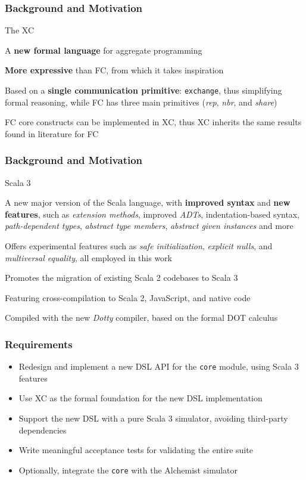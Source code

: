 \begin{frame}
    \frametitle{Background and Motivation}
    \begin{blockitems}{The \ac{XC}}
        \item A \textbf{new formal language} for aggregate programming~\cite{xc}
        \item \textbf{More expressive} than \ac{FC}, from which it takes inspiration
        \item Based on a \textbf{single communication primitive}: \texttt{exchange}, thus simplifying formal reasoning, while \ac{FC} has three main primitives (\textit{rep}, \textit{nbr}, and \textit{share})
        \item \ac{FC} core constructs can be implemented in \ac{XC}, thus \ac{XC} inherits the same results found in literature for \ac{FC}
    \end{blockitems}
\end{frame}

\begin{frame}
    \frametitle{Background and Motivation}
    \begin{blockitems}{Scala 3}
        \item A new major version of the Scala language, with \textbf{improved syntax} and \textbf{new features}, such as \textit{extension methods}, improved \textit{\acp{ADT}}, indentation-based syntax, \textit{path-dependent types}, \textit{abstract type members}, \textit{abstract given instances} and more
        \item Offers experimental features such as \textit{safe initialization}, \textit{explicit nulls}, and \textit{multiversal equality}, all employed in this work
        \item Promotes the migration of existing Scala 2 codebases to Scala 3
        \item Featuring cross-compilation to Scala 2, JavaScript, and native code
        \item Compiled with the new \textit{Dotty} compiler, based on the formal \ac{DOT} calculus
    \end{blockitems}
\end{frame}

\begin{frame}
    \frametitle{Requirements}
    \begin{itemize}
        \item Redesign and implement a new \ac{DSL} \ac{API} for the \texttt{core} module, using Scala 3 features
        \item Use \ac{XC} as the formal foundation for the new \ac{DSL} implementation
        \item Support the new \ac{DSL} with a pure Scala 3 simulator, avoiding third-party dependencies
        \item Write meaningful acceptance tests for validating the entire suite
        \item Optionally, integrate the \texttt{core} with the Alchemist simulator
    \end{itemize}
\end{frame}

